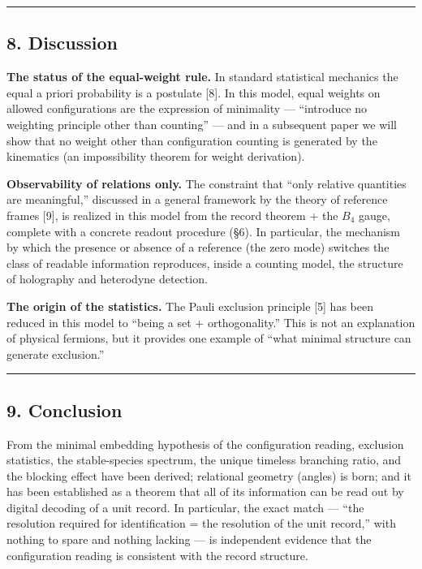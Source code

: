 \documentclass[
]{article}
\begin{document}
\begin{center}\rule{0.5\linewidth}{0.5pt}\end{center}

\subsection{8. Discussion}\label{discussion}

\textbf{The status of the equal-weight rule.} In standard statistical
mechanics the equal a priori probability is a postulate {[}8{]}. In this
model, equal weights on allowed configurations are the expression of
minimality --- ``introduce no weighting principle other than counting''
--- and in a subsequent paper we will show that no weight other than
configuration counting is generated by the kinematics (an impossibility
theorem for weight derivation).

\textbf{Observability of relations only.} The constraint that ``only
relative quantities are meaningful,'' discussed in a general framework
by the theory of reference frames {[}9{]}, is realized in this model
from the record theorem + the \(B_4\) gauge, complete with a concrete
readout procedure (§6). In particular, the mechanism by which the
presence or absence of a reference (the zero mode) switches the class of
readable information reproduces, inside a counting model, the structure
of holography and heterodyne detection.

\textbf{The origin of the statistics.} The Pauli exclusion principle
{[}5{]} has been reduced in this model to ``being a set +
orthogonality.'' This is not an explanation of physical fermions, but it
provides one example of ``what minimal structure can generate
exclusion.''

\begin{center}\rule{0.5\linewidth}{0.5pt}\end{center}

\subsection{9. Conclusion}\label{conclusion}

From the minimal embedding hypothesis of the configuration reading,
exclusion statistics, the stable-species spectrum, the unique timeless
branching ratio, and the blocking effect have been derived; relational
geometry (angles) is born; and it has been established as a theorem that
all of its information can be read out by digital decoding of a unit
record. In particular, the exact match --- ``the resolution required for
identification = the resolution of the unit record,'' with nothing to
spare and nothing lacking --- is independent evidence that the
configuration reading is consistent with the record structure.
\end{document}
